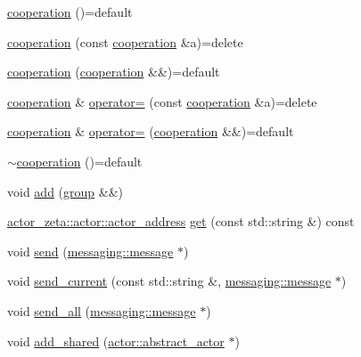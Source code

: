 \begin{DoxyCompactItemize}
\item 
\hyperlink{classactor__zeta_1_1environment_1_1cooperation_a7303d3b55a1753228e5bb94127b1bef7}{cooperation} ()=default
\item 
\hyperlink{classactor__zeta_1_1environment_1_1cooperation_acbd706a46fb05438d31fd10e66a8e939}{cooperation} (const \hyperlink{classactor__zeta_1_1environment_1_1cooperation}{cooperation} \&a)=delete
\item 
\hyperlink{classactor__zeta_1_1environment_1_1cooperation_a626fd6abb7e4a281b1778a1a6af20883}{cooperation} (\hyperlink{classactor__zeta_1_1environment_1_1cooperation}{cooperation} \&\&)=default
\item 
\hyperlink{classactor__zeta_1_1environment_1_1cooperation}{cooperation} \& \hyperlink{classactor__zeta_1_1environment_1_1cooperation_a54ad4ec359b156fca109dd2e59b2be72}{operator=} (const \hyperlink{classactor__zeta_1_1environment_1_1cooperation}{cooperation} \&a)=delete
\item 
\hyperlink{classactor__zeta_1_1environment_1_1cooperation}{cooperation} \& \hyperlink{classactor__zeta_1_1environment_1_1cooperation_a0c232882c1a2cab17a9207494528fb11}{operator=} (\hyperlink{classactor__zeta_1_1environment_1_1cooperation}{cooperation} \&\&)=default
\item 
\hyperlink{classactor__zeta_1_1environment_1_1cooperation_a5665799fd5b3e57fc8b43c0981d4bf6f}{$\sim$cooperation} ()=default
\item 
void \hyperlink{classactor__zeta_1_1environment_1_1cooperation_aa2735e88e03577473d1a1e3d339acf24}{add} (\hyperlink{classactor__zeta_1_1environment_1_1group}{group} \&\&)
\item 
\hyperlink{classactor__zeta_1_1actor_1_1actor__address}{actor\+\_\+zeta\+::actor\+::actor\+\_\+address} \hyperlink{classactor__zeta_1_1environment_1_1cooperation_a4e377910758dabfeb504e3fa228cdcd2}{get} (const std\+::string \&) const
\item 
void \hyperlink{classactor__zeta_1_1environment_1_1cooperation_ad014ac85b0b30c602ad11303c1d541ca}{send} (\hyperlink{classactor__zeta_1_1messaging_1_1message}{messaging\+::message} $\ast$)
\item 
void \hyperlink{classactor__zeta_1_1environment_1_1cooperation_ae2f3dd43fe394ac0a3f16fb4291a84a5}{send\+\_\+current} (const std\+::string \&, \hyperlink{classactor__zeta_1_1messaging_1_1message}{messaging\+::message} $\ast$)
\item 
void \hyperlink{classactor__zeta_1_1environment_1_1cooperation_a5a3c222e844a74ea0c1eadef8531b550}{send\+\_\+all} (\hyperlink{classactor__zeta_1_1messaging_1_1message}{messaging\+::message} $\ast$)
\item 
void \hyperlink{classactor__zeta_1_1environment_1_1cooperation_ae56bc9d52dda51010fccad4cdff10548}{add\+\_\+shared} (\hyperlink{classactor__zeta_1_1actor_1_1abstract__actor}{actor\+::abstract\+\_\+actor} $\ast$)
\end{DoxyCompactItemize}


